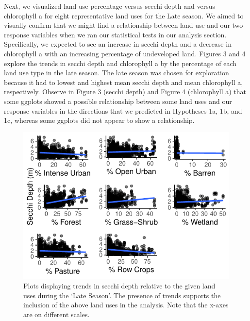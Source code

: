 \documentclass[12pt,]{article}
\begin{document}
Next, we visualized land use percentage versus secchi depth and versus
chlorophyll a for eight representative land uses for the Late season. We
aimed to visually confirm that we might find a relationship between land
use and our two response variables when we ran our statistical tests in
our analysis section. Specifically, we expected to see an increase in
secchi depth and a decrease in chlorophyll a with an increasing
percentage of undeveloped land. Figures 3 and 4 explore the trends in
secchi depth and chlorophyll a by the percentage of each land use type
in the late season. The late season was chosen for exploration because
it had to lowest and highest mean secchi depth and mean chlorophyll a,
respectively. Observe in Figure 3 (secchi depth) and Figure 4
(chlorophyll a) that some ggplots showed a possible relationship between
some land uses and our response variables in the directions that we
predicted in Hypotheses 1a, 1b, and 1c, whereas some ggplots did not
appear to show a relationship.

\begin{figure}
\centering
\includegraphics{Bollt_Greif_Raby_Roth_Project_Final_files/figure-latex/unnamed-chunk-6-1.pdf}
\caption{Plots displaying trends in secchi depth relative to the given
land uses during the `Late Season'. The presence of trends supports the
inclusion of the above land uses in the analysis. Note that the x-axes
are on different scales.}
\end{figure}
\end{document}
